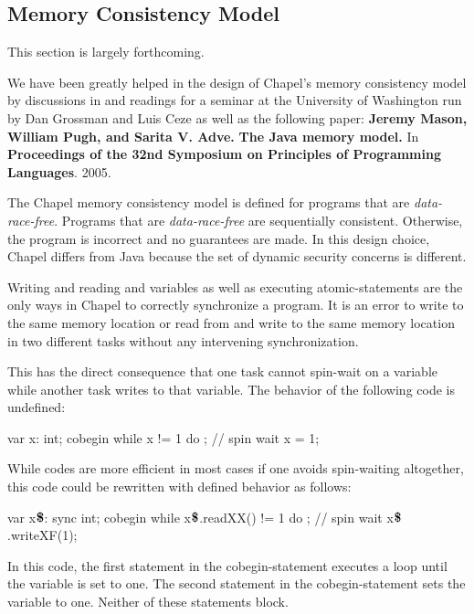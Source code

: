 \subsection{Memory Consistency Model}
\label{Memory_Consistency}

\begin{openissue}
This section is largely forthcoming.
\end{openissue}

We have been greatly helped in the design of Chapel's memory
consistency model by discussions in and readings for a seminar at the
University of Washington run by Dan Grossman and Luis Ceze as well as
the following paper: {\bf Jeremy Mason, William Pugh, and Sarita
V. Adve.}  {\bf The Java memory model.}  In {\bf Proceedings of the
32nd Symposium on Principles of Programming Languages}.  2005.

The Chapel memory consistency model is defined for programs that are
{\em data-race-free}.  Programs that are {\em data-race-free} are
sequentially consistent.  Otherwise, the program is incorrect and no
guarantees are made.  In this design choice, Chapel differs from Java
because the set of dynamic security concerns is different.

Writing and reading  and  variables as well as
executing atomic-statements are the only ways in Chapel to correctly
synchronize a program.  It is an error to write to the same memory
location or read from and write to the same memory location in two
different tasks without any intervening synchronization.

\begin{example}
This has the direct consequence that one task cannot spin-wait on a
variable while another task writes to that variable.  The behavior of
the following code is undefined:
\begin{chapel}
var x: int;
cobegin {
  while x != 1 do ;  // spin wait
  x = 1;
}
\end{chapel}
While codes are more efficient in most cases if one avoids
spin-waiting altogether, this code could be rewritten with defined
behavior as follows:
\begin{chapelpre}
\end{chapelpre}
\begin{chapel}
var x$\mbox{{\bf \$}}$: sync int;
cobegin {
  while x$\mbox{{\bf \$}}$.readXX() != 1 do ;  // spin wait
  x$\mbox{{\bf \$}}$.writeXF(1);
}
\end{chapel}
\begin{chapeloutput}
\end{chapeloutput}
In this code, the first statement in the cobegin-statement executes a
loop until the variable is set to one.  The second statement in the
cobegin-statement sets the variable to one.  Neither of these
statements block.
\end{example}
